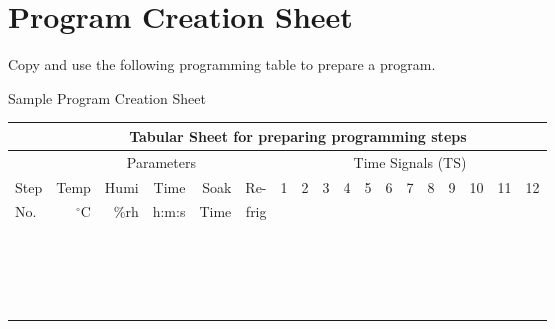 \clearpage 
\section{Program Creation Sheet}

Copy and use the following programming table to prepare a program. 

\begin{table2}[label={mynamelabel},nameref={Title}]{Sample Program Creation Sheet} {\label{tab:sample-prog-04}}
{%
\begin{tabular}{l | r| r| r| r| r| r| r| r| r| r|r| r| r| r| r| r| r}
\hline %
\multicolumn{1}{l|}{} &  \multicolumn{17}{c}{\bf{Tabular Sheet for preparing programming steps}}          \\
\hline \hline
\multicolumn{1}{l|}{} &  \multicolumn{5}{c|}{Parameters} &   \multicolumn{12}{c}{Time Signals (TS)}       \\
Step & Temp             & Humi   & Time & Soak & Re-  & 1 & 2 & 3 & 4 & 5 & 6 & 7 & 8 & 9 & 10 & 11 & 12\\
No.  & ${}^{\circ}$C & \%rh & h:m:s & Time &  frig       &  &  &  &  &  &  &  &  &  &  &  & \\
\hline 
 &   &  &   &  &  &  &  &  &  &  &  &  &  &  &  &  & \\
 &   &  &   &  &  &  &  &  &  &  &  &  &  &  &  &  & \\
 &   &  &   &  &  &  &  &  &  &  &  &  &  &  &  &  & \\
 &   &  &   &  &  &  &  &  &  &  &  &  &  &  &  &  & \\
 &   &  &   &  &  &  &  &  &  &  &  &  &  &  &  &  & \\
 &   &  &   &  &  &  &  &  &  &  &  &  &  &  &  &  & \\
 &   &  &   &  &  &  &  &  &  &  &  &  &  &  &  &  & \\
 &   &  &   &  &  &  &  &  &  &  &  &  &  &  &  &  & \\
 &   &  &   &  &  &  &  &  &  &  &  &  &  &  &  &  & \\
 &   &  &   &  &  &  &  &  &  &  &  &  &  &  &  &  & \\
 &   &  &   &  &  &  &  &  &  &  &  &  &  &  &  &  & \\
 &   &  &   &  &  &  &  &  &  &  &  &  &  &  &  &  & \\
 &   &  &   &  &  &  &  &  &  &  &  &  &  &  &  &  & \\
 &   &  &   &  &  &  &  &  &  &  &  &  &  &  &  &  & \\
 &   &  &   &  &  &  &  &  &  &  &  &  &  &  &  &  & \\
 &   &  &   &  &  &  &  &  &  &  &  &  &  &  &  &  & \\
 &   &  &   &  &  &  &  &  &  &  &  &  &  &  &  &  & \\
 &   &  &   &  &  &  &  &  &  &  &  &  &  &  &  &  & \\
\end{tabular} 
}
\end{table2}


